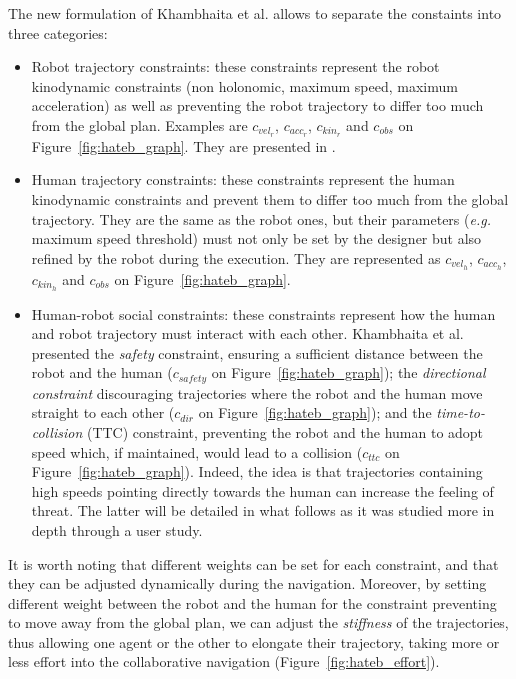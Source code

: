 \documentclass[a4paper,11pt,twoside]{StyleThese}
\begin{document}
The new formulation of Khambhaita et al. allows to separate the constaints into three categories:
\begin{itemize}
\item Robot trajectory constraints: these constraints represent the robot kinodynamic constraints (non holonomic, maximum speed, maximum acceleration) as well as preventing the robot trajectory to differ too much from the global plan. Examples are $c_{vel_{r}}$,  $c_{acc_{r}}$, $c_{kin_{r}}$ and $c_{obs}$ on Figure~\ref{fig:hateb_graph}. They are presented in \cite{rosmann_efficient_2013}.
\item Human trajectory constraints: these constraints represent the human kinodynamic constraints and prevent them to differ too much from the global trajectory. They are the same as the robot ones, but their parameters (\textit{e.g.} maximum speed threshold) must not only be set by the designer but also refined by the robot during the execution. They are represented as $c_{vel_{h}}$,  $c_{acc_{h}}$, $c_{kin_{h}}$ and $c_{obs}$ on Figure~\ref{fig:hateb_graph}.
\item Human-robot social constraints: these constraints represent how the human and robot trajectory must interact with each other. Khambhaita et al. presented the \textit{safety} constraint, ensuring a sufficient distance between the robot and the human ($c_{safety}$ on Figure~\ref{fig:hateb_graph}); the \textit{directional constraint} discouraging trajectories where the robot and the human move straight to each other ($c_{dir}$ on Figure~\ref{fig:hateb_graph}); and the \textit{time-to-collision} (TTC) constraint, preventing the robot and the human to adopt speed which, if maintained, would lead to a collision ($c_{ttc}$ on Figure~\ref{fig:hateb_graph}). Indeed, the idea is that trajectories containing high speeds pointing directly towards the human can increase the feeling of threat. The latter will be detailed in what follows as it was studied more in depth through a user study.
\end{itemize}

It is worth noting that different weights can be set for each constraint, and that they can be adjusted dynamically during the navigation. Moreover, by setting different weight between the robot and the human for the constraint preventing to move away from the global plan, we can adjust the \textit{stiffness} of the trajectories, thus allowing one agent or the other to elongate their trajectory, taking more or less effort into the collaborative navigation (Figure~\ref{fig:hateb_effort}).
\end{document}

